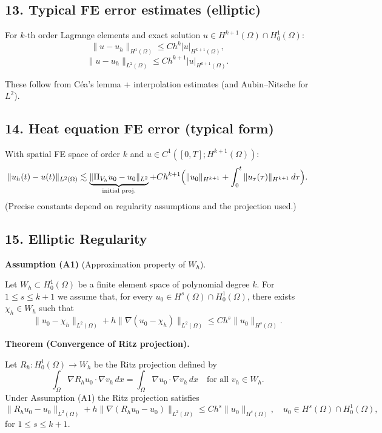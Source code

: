 \subsection*{13. Typical FE error estimates (elliptic)}

For $k$-th order Lagrange elements and exact solution $u\in H^{k+1}(\Omega)\cap H_0^1(\Omega)$:
\[
    \|u-u_h\|_{H^1(\Omega)} \le C h^k |u|_{H^{k+1}(\Omega)},
\]
\[
    \|u-u_h\|_{L^2(\Omega)} \le C h^{k+1} |u|_{H^{k+1}(\Omega)}.
\]

These follow from Céa's lemma + interpolation estimates (and Aubin--Nitsche for $L^2$).

\subsection*{14. Heat equation FE error (typical form)}

With spatial FE space of order $k$ and $u\in C^1([0,T];H^{k+1}(\Omega))$:
\[
    \|u_h(t) - u(t)\|_{L^2(\Omega)}
    \lesssim
    \underbrace{\|\Pi_{V_h}u_0 - u_0\|_{L^2}}_{\text{initial proj.}}
    + C h^{k+1}\Bigl(
    \|u_0\|_{H^{k+1}} + \int_0^t\|u_\tau(\tau)\|_{H^{k+1}}\,d\tau
    \Bigr).
\]
(Precise constants depend on regularity assumptions and the projection used.)

\subsection*{15. Elliptic Regularity}

\textbf{Assumption (A1)} (Approximation property of $W_h$).

Let $W_h \subset H_0^1(\Omega)$ be a finite element space of polynomial degree $k$. For $1 \le s \le k+1$ we assume that, for every
$u_0 \in H^s(\Omega) \cap H_0^1(\Omega)$, there exists $\chi_h \in W_h$ such that
\[
    \|u_0 - \chi_h\|_{L^2(\Omega)} + h \|\nabla(u_0 - \chi_h)\|_{L^2(\Omega)} \le C h^s \|u_0\|_{H^s(\Omega)}.\tag{A1}
\]

\textbf{Theorem (Convergence of Ritz projection).}

Let $R_h : H_0^1(\Omega) \to W_h$ be the Ritz projection defined by
\[
    \int_\Omega \nabla R_h u_0 \cdot \nabla v_h \, dx
    =
    \int_\Omega \nabla u_0 \cdot \nabla v_h \, dx
    \quad \text{for all } v_h \in W_h.
\]
Under Assumption (A1) the Ritz projection satisfies
\[
    \|R_h u_0 - u_0\|_{L^2(\Omega)}
    + h \|\nabla(R_h u_0 - u_0)\|_{L^2(\Omega)}
    \le
    C h^s \|u_0\|_{H^s(\Omega)},
    \quad
    u_0 \in H^s(\Omega) \cap H_0^1(\Omega),
    \tag{Ritz-conv}
\]
for $1 \le s \le k+1$.

